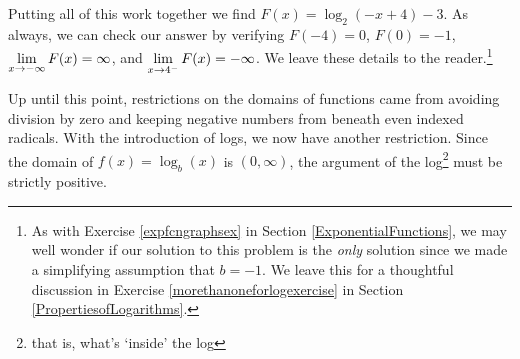 \documentclass{ximera}
\begin{document}
\begin{example}
\begin{enumerate}
\smallskip

Putting all of this work together we find $F(x) = \log_{2}(-x+4)-3$.  As always, we can check our answer by verifying $F(-4) = 0$, $F(0) = -1$, $\ds{\lim_{x \rightarrow -\infty} F(x) = \infty}$, and $\ds{\lim_{x \rightarrow 4^{-}} F(x) =  -\infty}$. We leave these details to the reader.\footnote{As with Exercise \ref{expfcngraphsex} in Section \ref{ExponentialFunctions},  we may well wonder if our solution to this problem  is the  \textit{only} solution since we made a simplifying assumption that $b=-1$.  We leave this for a thoughtful discussion in Exercise \ref{morethanoneforlogexercise} in Section \ref{PropertiesofLogarithms}.}

\end{enumerate}

\end{example}

Up until this point, restrictions on the domains of functions came from avoiding division by zero and keeping negative numbers from beneath even indexed radicals.  With the introduction of logs, we now have another restriction.  Since the domain of $f(x) = \log_{b}(x)$ is $(0, \infty)$, the argument of the log\footnote{ that is, what's `inside' the log}  must be strictly positive.  
\end{document}
